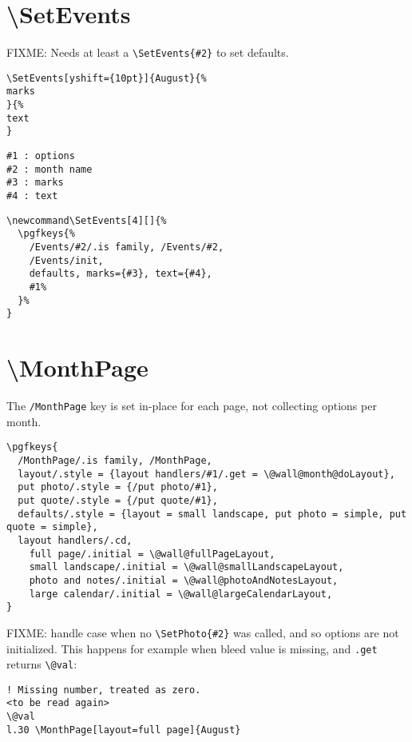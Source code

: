 \documentclass[11pt,oneside]{memoir-article}
\begin{document}
\section{\textbackslash SetEvents}
\label{sec:org73f2042}

FIXME: Needs at least a \texttt{\textbackslash{}SetEvents\{\#2\}} to set defaults.

\begin{verbatim}
\SetEvents[yshift={10pt}]{August}{%
marks
}{%
text
}
\end{verbatim}


\begin{verbatim}
#1 : options
#2 : month name
#3 : marks
#4 : text
\end{verbatim}


\begin{verbatim}
\newcommand\SetEvents[4][]{%
  \pgfkeys{%
    /Events/#2/.is family, /Events/#2,
    /Events/init,
    defaults, marks={#3}, text={#4},
    #1%
  }%
}
\end{verbatim}

\section{\textbackslash MonthPage}
\label{sec:org6f244a2}

The \texttt{/MonthPage} key is set in-place for each page, not collecting options per month.

\begin{verbatim}
\pgfkeys{
  /MonthPage/.is family, /MonthPage,
  layout/.style = {layout handlers/#1/.get = \@wall@month@doLayout},
  put photo/.style = {/put photo/#1},
  put quote/.style = {/put quote/#1},
  defaults/.style = {layout = small landscape, put photo = simple, put quote = simple},
  layout handlers/.cd,
    full page/.initial = \@wall@fullPageLayout,
    small landscape/.initial = \@wall@smallLandscapeLayout,
    photo and notes/.initial = \@wall@photoAndNotesLayout,
    large calendar/.initial = \@wall@largeCalendarLayout,
}
\end{verbatim}

FIXME: handle case when no \texttt{\textbackslash{}SetPhoto\{\#2\}} was called, and so options are not
initialized. This happens for example when bleed value is missing, and \texttt{.get}
returns \texttt{\textbackslash{}@val}:

\begin{verbatim}
! Missing number, treated as zero.
<to be read again> 
\@val 
l.30 \MonthPage[layout=full page]{August}
\end{verbatim}
\end{document}
